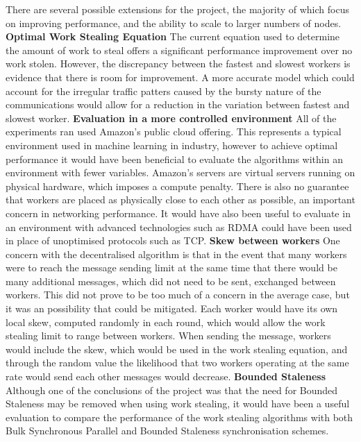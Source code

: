 \documentclass[12pt]{article}
\begin{document}
There are several possible extensions for the project, the majority of which focus on improving performance, and the ability to scale to larger numbers of nodes.
\newline
\newline
\textbf{Optimal Work Stealing Equation}		The current equation used to determine the amount of work to steal offers a significant performance improvement over no work stolen. However, the discrepancy between the fastest and slowest workers is evidence that there is room for improvement. A more accurate model which could account for the irregular traffic patters caused by the bursty nature of the communications would allow for a reduction in the variation between fastest and slowest worker.
\newline
\newline
\textbf{Evaluation in a more controlled environment}		All of the experiments ran used Amazon's public cloud offering. This represents a typical environment used in machine learning in industry, however to achieve optimal performance it would have been beneficial to evaluate the algorithms within an environment with fewer variables. Amazon's servers are virtual servers running on physical hardware, which imposes a compute penalty. There is also no guarantee that workers are placed as physically close to each other as possible, an important concern in networking performance. It would have also been useful to evaluate in an environment with advanced technologies such as RDMA could have been used in place of unoptimised protocols such as TCP.
\newline
\newline
\textbf{Skew between workers}	One concern with the decentralised algorithm is that in the event that many workers were to reach the message sending limit at the same time that there would be many additional messages, which did not need to be sent, exchanged between workers. This did not prove to be too much of a concern in the average case, but it was an possibility that could be mitigated. Each worker would have its own local skew, computed randomly in each round, which would allow the work stealing limit to range between workers. When sending the  message, workers would include the skew, which would be used in the work stealing equation, and through the random value the likelihood that two workers operating at the same rate would send each other  messages would decrease.
\newline
\newline
\textbf{Bounded Staleness}		Although one of the conclusions of the project was that the need for Bounded Staleness may be removed when using work stealing, it would have been a useful evaluation to compare the performance of the work stealing algorithms with both Bulk Synchronous Parallel and Bounded Staleness synchronisation schemes.	


\newpage



\end{document}
